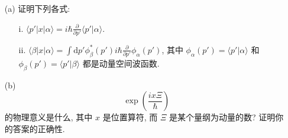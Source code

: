 \documentclass{assignment}
\begin{document}
\begin{prob}
    \begin{itemize}
        \item[(a)] 证明下列各式:
        \begin{itemize}
            \item[i.] $\langle p'\rvert x\lvert\alpha\rangle=i\hbar\frac{\partial}{\partial p'}\langle p'\vert\alpha\rangle$.
            \item[ii.] $\langle\beta\rvert x\lvert\alpha\rangle=\int\mathrm{d}p'\phi_{\beta}^*(p')i\hbar\frac{\partial}{\partial p'}\phi_{\alpha}(p')$, 其中 $\phi_{\alpha}(p')=\langle p'\vert\alpha\rangle$ 和 $\phi_{\beta}(p')=\langle p'\vert\beta\rangle$ 都是动量空间波函数.
        \end{itemize}
        \item[(b)] 
        \[
            \exp\left(\frac{ix\Xi}{\hbar}\right)
        \]
        的物理意义是什么, 其中 $x$ 是位置算符, 而 $\Xi$ 是某个量纲为动量的数? 证明你的答案的正确性.
    \end{itemize}
\end{prob}
\end{document}
